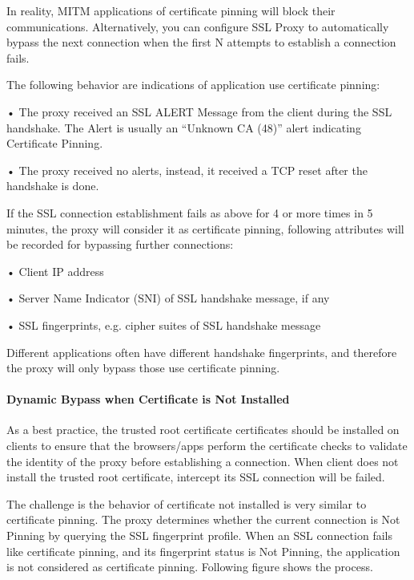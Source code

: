 In reality, MITM applications of certificate pinning will block their communications. Alternatively, you can configure SSL Proxy to automatically bypass the next connection when the first N attempts to establish a connection fails.


The following behavior are indications of application use certificate pinning:

• The proxy received an SSL ALERT Message from the client during the SSL handshake. The Alert is usually an “Unknown CA (48)” alert indicating Certificate Pinning.


• The proxy received no alerts, instead, it received a TCP reset after the handshake is done.


If the SSL connection establishment fails as above for 4 or more times in 5 minutes, the proxy will consider it as certificate pinning, following attributes will be recorded for bypassing further connections:


• Client IP address


• Server Name Indicator (SNI) of SSL handshake message, if any


• SSL fingerprints, e.g. cipher suites of SSL handshake message


Different applications often have different handshake fingerprints, and therefore the proxy will only bypass those use certificate pinning. 

\hypertarget{link:Dynamic Bypass when Certificate is Not Installed}{\paragraph{Dynamic Bypass when Certificate is Not Installed}}
\label{sec:decrypt:profile:decryptionprofile:bypass:notinstalled}

As a best practice, the trusted root certificate certificates should be installed on clients to ensure that the browsers/apps perform the certificate checks to validate the identity of the proxy before establishing a connection. When client does not install the trusted root certificate, intercept its SSL connection will be failed. 


The challenge is the behavior of certificate not installed is very similar to certificate pinning. The proxy determines whether the current connection is Not Pinning by querying the SSL fingerprint profile. When an SSL connection fails like certificate pinning, and its fingerprint status is Not Pinning, the application is not considered as certificate pinning. Following figure shows the process.



